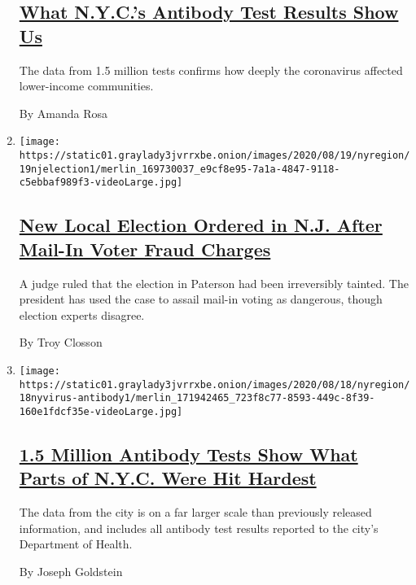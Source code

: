 \begin{enumerate}
  \hypertarget{what-nycs-antibody-test-results-show-us}{%
  \subsection{\texorpdfstring{\href{/2020/08/20/nyregion/nyc-coronavirus-antibody-testing.html}{What
  N.Y.C.'s Antibody Test Results Show
  Us}}{What N.Y.C.'s Antibody Test Results Show Us}}\label{what-nycs-antibody-test-results-show-us}}

  The data from 1.5 million tests confirms how deeply the coronavirus
  affected lower-income communities.

  By Amanda Rosa
\item
  \texttt{[image: https://static01.graylady3jvrrxbe.onion/images/2020/08/19/nyregion/19njelection1/merlin\_169730037\_e9cf8e95-7a1a-4847-9118-c5ebbaf989f3-videoLarge.jpg]}

  \hypertarget{new-local-election-ordered-in-nj-after-mail-in-voter-fraud-charges}{%
  \subsection{\texorpdfstring{\href{/2020/08/19/nyregion/nj-election-mail-voting-fraud.html}{New
  Local Election Ordered in N.J. After Mail-In Voter Fraud
  Charges}}{New Local Election Ordered in N.J. After Mail-In Voter Fraud Charges}}\label{new-local-election-ordered-in-nj-after-mail-in-voter-fraud-charges}}

  A judge ruled that the election in Paterson had been irreversibly
  tainted. The president has used the case to assail mail-in voting as
  dangerous, though election experts disagree.

  By Troy Closson
\item
  \texttt{[image: https://static01.graylady3jvrrxbe.onion/images/2020/08/18/nyregion/18nyvirus-antibody1/merlin\_171942465\_723f8c77-8593-449c-8f39-160e1fdcf35e-videoLarge.jpg]}

  \hypertarget{15-million-antibody-tests-show-what-parts-of-nyc-were-hit-hardest}{%
  \subsection{\texorpdfstring{\href{/2020/08/19/nyregion/new-york-city-antibody-test.html}{1.5
  Million Antibody Tests Show What Parts of N.Y.C. Were Hit
  Hardest}}{1.5 Million Antibody Tests Show What Parts of N.Y.C. Were Hit Hardest}}\label{15-million-antibody-tests-show-what-parts-of-nyc-were-hit-hardest}}

  The data from the city is on a far larger scale than previously
  released information, and includes all antibody test results reported
  to the city's Department of Health.

  By Joseph Goldstein
\end{enumerate}

